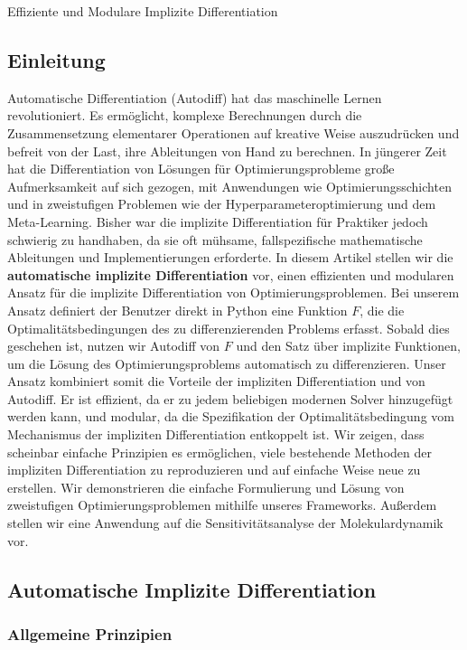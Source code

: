 Effiziente und Modulare Implizite Differentiation

\subsection{Einleitung}

Automatische Differentiation (Autodiff) hat das maschinelle Lernen revolutioniert.  Es ermöglicht, komplexe Berechnungen durch die Zusammensetzung elementarer Operationen auf kreative Weise auszudrücken und befreit von der Last, ihre Ableitungen von Hand zu berechnen. In jüngerer Zeit hat die Differentiation von Lösungen für Optimierungsprobleme große Aufmerksamkeit auf sich gezogen, mit Anwendungen wie Optimierungsschichten und in zweistufigen Problemen wie der Hyperparameteroptimierung und dem Meta-Learning. Bisher war die implizite Differentiation für Praktiker jedoch schwierig zu handhaben, da sie oft mühsame, fallspezifische mathematische Ableitungen und Implementierungen erforderte. In diesem Artikel stellen wir die \textbf{automatische implizite Differentiation} vor, einen effizienten und modularen Ansatz für die implizite Differentiation von Optimierungsproblemen. Bei unserem Ansatz definiert der Benutzer direkt in Python eine Funktion $F$, die die Optimalitätsbedingungen des zu differenzierenden Problems erfasst. Sobald dies geschehen ist, nutzen wir Autodiff von $F$ und den Satz über implizite Funktionen, um die Lösung des Optimierungsproblems automatisch zu differenzieren. Unser Ansatz kombiniert somit die Vorteile der impliziten Differentiation und von Autodiff. Er ist effizient, da er zu jedem beliebigen modernen Solver hinzugefügt werden kann, und modular, da die Spezifikation der Optimalitätsbedingung vom Mechanismus der impliziten Differentiation entkoppelt ist. Wir zeigen, dass scheinbar einfache Prinzipien es ermöglichen, viele bestehende Methoden der impliziten Differentiation zu reproduzieren und auf einfache Weise neue zu erstellen. Wir demonstrieren die einfache Formulierung und Lösung von zweistufigen Optimierungsproblemen mithilfe unseres Frameworks. Außerdem stellen wir eine Anwendung auf die Sensitivitätsanalyse der Molekulardynamik vor.

\subsection{Automatische Implizite Differentiation}
\label{sec:framework}

\subsubsection{Allgemeine Prinzipien}
\label{sec:general_principles}

